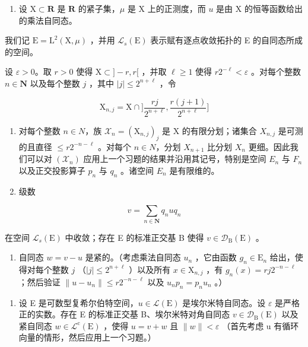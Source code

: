 \begin{enumerate}
\def\labelenumi{\arabic{enumi})}
\setcounter{enumi}{18}
\tightlist
\item
  设 \(\mathrm{X} \subset \mathbf{R}\) 是 \(\mathbf{R}\) 的紧子集，\(\mu\) 是 \(\mathrm{X}\) 上的正测度，而 \(u\) 是由 \(\mathrm{X}\) 的恒等函数给出的乘法自同态。
\end{enumerate}

我们记 \(\mathrm{E}=\mathrm{L}^{2}(\mathrm{X},\mu)\) ，并用 \(\mathcal{L}_{s}(\mathrm{E})\) 表示赋有逐点收敛拓扑的 E 的自同态所成的空间。

设 \(\varepsilon > 0\)。取 \(r > 0\) 使得 \(\mathrm{X} \subset ] - r, r[\) ，并取 \(\ell \geqslant 1\) 使得 \(r2^{-\ell} < \varepsilon\) 。对每个整数 \(n \in \mathbf{N}\) 以及每个整数 \(j\) ，其中 \(|j| \leqslant 2^{n + \ell}\) ，令

\[
\mathrm{X} _ {n, j} = \mathrm{X} \cap \Big ] \frac {r j}{2 ^ {n + \ell}}, \frac {r (j + 1)}{2 ^ {n + \ell}} \Big ]
\]

\begin{enumerate}
\def\labelenumi{\alph{enumi})}
\item
  对每个整数 \(n \in N\)，族 \(\mathcal{X}_{n} = (\mathrm{X}_{n,j})_{j}\) 是 X 的有限分划；诸集合 \(X_{n,j}\) 是可测的且直径 \(\leqslant r2^{-n-\ell}\) 。对每个 \(n \in N\)，分划 \(X_{n+1}\) 比分划 \(X_{n}\) 更细。因此我们可以对 \((\mathcal{X}_{n})\) 应用上一个习题的结果并沿用其记号，特别是空间 \(E_{n}\) 与 \(F_{n}\) 以及正交投影算子 \(p_{n}\) 与 \(q_{n}\) 。诸空间 \(E_{n}\) 是有限维的。
\item
  级数
\end{enumerate}

\[
v = \sum_ {n \in \mathbf {N}} q _ {n} u q _ {n}
\]

在空间 \(\mathcal{L}_{s}(\mathrm{E})\) 中收敛；存在 E 的标准正交基 B 使得 \(v \in \mathcal{D}_{\mathrm{B}}(\mathrm{E})\) 。

\begin{enumerate}
\def\labelenumi{\alph{enumi})}
\setcounter{enumi}{2}
\tightlist
\item
  自同态 \(w = v - u\) 是紧的。（考虑乘法自同态 \(u_n\) ，它由函数 \(g_n \in \mathrm{E}_n\) 给出，使得对每个整数 \(j\) （\(|j| \leqslant 2^{n + \ell}\) ）以及所有 \(x \in \mathrm{X}_{n,j}\) ，有 \(g_n(x) = rj2^{-n - \ell}\) ；然后验证 \(\| u - u_n \| \leqslant r2^{-n - \ell}\) 以及 \(u_n p_n = p_n u_n\) 。）
\end{enumerate}

\begin{enumerate}
\def\labelenumi{\arabic{enumi})}
\setcounter{enumi}{19}
\tightlist
\item
  设 E 是可数型复希尔伯特空间，\(u \in \mathcal{L}(\mathrm{E})\) 是埃尔米特自同态。设 \(\varepsilon\) 是严格正的实数。存在 E 的标准正交基 B、埃尔米特对角自同态 \(v \in \mathcal{D}_{\mathrm{B}}(\mathrm{E})\) 以及紧自同态 \(w \in \mathcal{L}^{\mathrm{c}}(\mathrm{E})\) ，使得 \(u = v + w\) 且 \(\|w\| < \varepsilon\) （首先考虑 u 有循环向量的情形，然后应用上一个习题。）
\end{enumerate}

